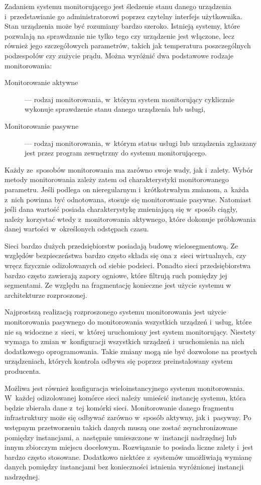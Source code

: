 Zadaniem systemu monitorującego jest śledzenie stanu danego urządzenia
i~przedstawianie go administratorowi poprzez czytelny interfejs
użytkownika. Stan urządzenia może być rozumiany bardzo
szeroko. Istnieją systemy, które pozwalają na sprawdzanie nie tylko
tego czy urządzenie jest włączone, lecz również jego szczegółowych
parametrów, takich jak temperatura poszczególnych podzespołów czy
zużycie prądu. Można wyróżnić dwa podstawowe rodzaje monitorowania:

\begin{description}
\item[Monitorowanie aktywne] --- rodzaj monitorowania, w~którym system
  monitorujący cyklicznie wykonuje sprawdzenie stanu danego
  urządzenia lub usługi,
\item[Monitorowanie pasywne] --- rodzaj monitorowania, w~którym status
  usługi lub urządzenia zgłaszany jest przez program zewnętrzny do
  systemu monitorującego.
\end{description}

Każdy ze~sposobów monitorowania ma zarówno swoje wady, jak
i~zalety. Wybór metody monitorowania zależy zatem od charakterystyki
monitorowanego parametru. Jeśli podlega on nieregularnym
i~krótkotrwałym zmianom, a~każda z~nich powinna być odnotowana,
stosuje się monitorowanie pasywne. Natomiast jeśli dana wartość
posiada charakterystykę zmieniającą się w~sposób ciągły, należy
korzystać wtedy z~monitorowania aktywnego, które dokonuje próbkowania
danej wartości w~określonych odstępach czasu.

Sieci bardzo dużych przedsiębiorstw posiadają budowę
wielosegmentową. Ze względów bezpieczeństwa bardzo często składa się
ona z~sieci wirtualnych, czy wręcz fizycznie odizolowanych od siebie
podsieci. Ponadto sieci przedsiębiorstwa bardzo często zawierają
zapory ogniowe, które filtrują ruch pomiędzy jej segmentami. Ze
względu na fragmentację konieczne jest użycie systemu w architekturze
rozproszonej.

Najprostszą realizacją rozproszonego systemu monitorowania jest użycie
monitorowania pasywnego do monitorowania wszystkich urządzeń i~usług,
które nie są widoczne z~sieci, w~której uruchomiony jest system
monitorujący. Niestety wymaga to zmian w~konfiguracji wszystkich
urządzeń i~uruchomienia na nich dodatkowego oprogramowania. Takie
zmiany mogą nie być dozwolone na prostych urządzeniach, których
kontrola odbywa się poprzez preinstalowany system producenta. 

Możliwa jest również konfiguracja wieloinstancyjnego systemu
monitorowania. W~każdej odizolowanej komórce sieci należy umieścić
instancję systemu, która będzie zbierała dane z~tej komórki
sieci. Monitorowanie danego fragmentu infrastruktury może się odbywać
zarówno w~sposób aktywny, jak i~pasywny. Po wstępnym przetworzeniu
takich danych muszą one zostać zsynchronizowane pomiędzy instancjami,
a~następnie umieszczone w~instancji nadrzędnej lub innym zbiorczym
miejscu docelowym. Rozwiązanie to posiada liczne zalety i~jest bardzo
często stosowane. Dodatkowo niektóre z~systemów umożliwiają wymianę
danych pomiędzy instancjami bez konieczności istnienia wyróżnionej
instancji nadrzędnej.

